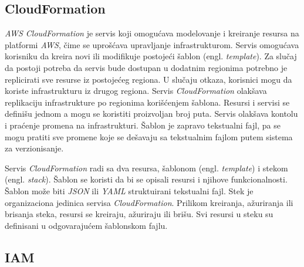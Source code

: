 \documentclass[12pt,oneside]{memoir}
\begin{document}
\subsection{CloudFormation}
  
\emph{AWS CloudFormation} je servis koji omogućava modelovanje i kreiranje resursa na platformi \emph{AWS}, čime se uprošćava upravljanje infrastrukturom. Servis omogućava korisniku da kreira novi ili modifikuje postojeći šablon (engl. \emph{template}). Za slučaj da postoji potreba da servis bude dostupan u dodatnim regionima potrebno je replicirati sve resurse iz postojećeg regiona. U slučaju otkaza, korisnici mogu da koriste infrastrukturu iz drugog regiona. Servis \emph{CloudFormation} olakšava replikaciju infrastrukture po regionima korišćenjem šablona. Resursi i servisi se definišu jednom a mogu se koristiti proizvoljan broj puta. Servis olakšava kontolu i praćenje promena na infrastrukturi. Šablon je zapravo tekstualni fajl, pa se mogu pratiti sve promene koje se dešavaju sa tekstualnim fajlom putem sistema za verzionisanje.
  
Servis \emph{CloudFormation} radi sa dva resursa, šablonom (engl. \emph{template}) i stekom (engl. \emph{stack}). Šablon se koristi da bi se opisali resursi i njihove funkcionalnosti. Šablon može biti \emph{JSON} ili \emph{YAML} struktuirani tekstualni fajl. Stek je organizaciona jedinica servisa \emph{CloudFormation}. Prilikom kreiranja, ažuriranja ili brisanja steka, resursi se kreiraju, ažuriraju ili brišu. Svi resursi u steku su definisani u odgovarajućem šablonskom fajlu.
  
\subsection{IAM}
  
\end{document}
